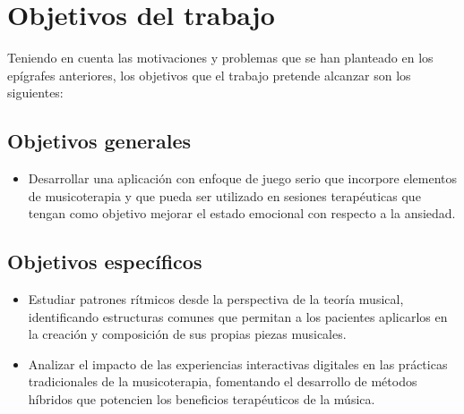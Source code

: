\section{Objetivos del trabajo}

Teniendo en cuenta las motivaciones y problemas que se han planteado en los epígrafes anteriores, los objetivos que el trabajo pretende alcanzar son los siguientes:

\subsection{Objetivos generales}

\begin{itemize}
	\item Desarrollar una aplicación con enfoque de juego serio que incorpore elementos de musicoterapia y que pueda ser utilizado en sesiones terapéuticas que tengan como objetivo mejorar el estado emocional con respecto a la ansiedad.
\end{itemize}

\subsection{Objetivos específicos}

\begin{itemize}
	\item Estudiar patrones rítmicos desde la perspectiva de la teoría musical, identificando estructuras comunes que permitan a los pacientes aplicarlos en la creación y composición de sus propias piezas musicales.
	\item Analizar el impacto de las experiencias interactivas digitales en las prácticas tradicionales de la musicoterapia, fomentando el desarrollo de métodos híbridos que potencien los beneficios terapéuticos de la música.
\end{itemize}